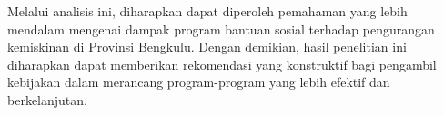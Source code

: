 \documentclass{article}
\begin{document}
Melalui analisis ini, diharapkan dapat diperoleh pemahaman yang lebih mendalam mengenai dampak program bantuan sosial terhadap pengurangan kemiskinan di Provinsi Bengkulu. Dengan demikian, hasil penelitian ini diharapkan dapat memberikan rekomendasi yang konstruktif bagi pengambil kebijakan dalam merancang program-program yang lebih efektif dan berkelanjutan.






\end{document}
